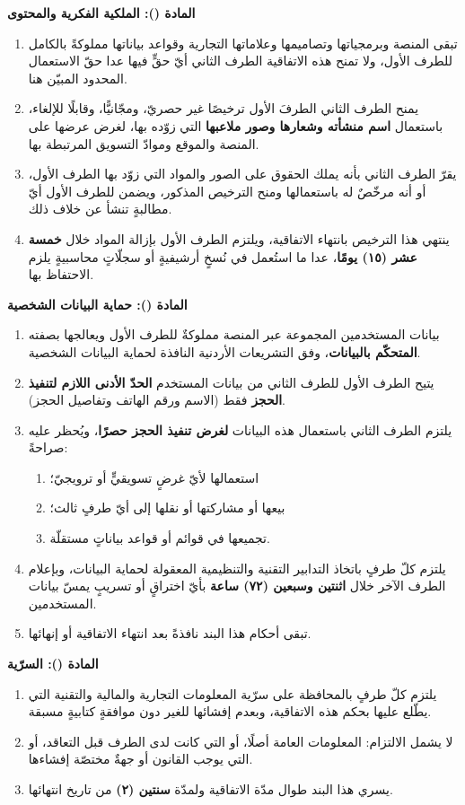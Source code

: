 \documentclass[12pt,a4paper]{article}
\newcounter{bndc}
\newcommand{\bnd}[1]{%
  \vspace{10pt}\par\noindent
  {\color{teal}\bfseries\large المادة (\arabic{bndc}): #1}%
  \stepcounter{bndc}%
  \par\vspace{2pt}\noindent{\color{rule}\rule{\linewidth}{0.6pt}}\par\vspace{4pt}%
}
\newcommand{\mlh}[1]{{\bfseries #1}}
\newenvironment{bnditems}
  {\begin{enumerate}[label=\arabic{bndc}.\arabic*,leftmargin=1.6em,itemsep=3pt,topsep=3pt]}
  {\end{enumerate}}
\newenvironment{sublist}
  {\begin{enumerate}[label=(\alph*),leftmargin=1.6em,itemsep=2pt,topsep=2pt]}
  {\end{enumerate}}
\begin{document}
\bnd{الملكية الفكرية والمحتوى}
\begin{bnditems}
  \item تبقى المنصة وبرمجياتها وتصاميمها وعلاماتها التجارية وقواعد بياناتها مملوكةً بالكامل للطرف الأول، ولا تمنح هذه الاتفاقية الطرف الثاني أيّ حقٍّ فيها عدا حقّ الاستعمال المحدود المبيّن هنا.
  \item يمنح الطرف الثاني الطرفَ الأول ترخيصًا غير حصريّ، ومجّانيًّا، وقابلًا للإلغاء، باستعمال \mlh{اسم منشأته وشعارها وصور ملاعبها} التي زوّده بها، لغرض عرضها على المنصة والموقع وموادّ التسويق المرتبطة بها.
  \item يقرّ الطرف الثاني بأنه يملك الحقوق على الصور والمواد التي زوّد بها الطرف الأول، أو أنه مرخّصٌ له باستعمالها ومنح الترخيص المذكور، ويضمن للطرف الأول أيّ مطالبةٍ تنشأ عن خلاف ذلك.
  \item ينتهي هذا الترخيص بانتهاء الاتفاقية، ويلتزم الطرف الأول بإزالة المواد خلال \mlh{خمسة عشر (١٥) يومًا}، عدا ما استُعمل في نُسخٍ أرشيفيةٍ أو سجلّاتٍ محاسبيةٍ يلزم الاحتفاظ بها.
\end{bnditems}

\bnd{حماية البيانات الشخصية}\label{art:data}
\begin{bnditems}
  \item بيانات المستخدمين المجموعة عبر المنصة مملوكةٌ للطرف الأول ويعالجها بصفته \mlh{المتحكّم بالبيانات}، وفق التشريعات الأردنية النافذة لحماية البيانات الشخصية.
  \item يتيح الطرف الأول للطرف الثاني من بيانات المستخدم \mlh{الحدّ الأدنى اللازم لتنفيذ الحجز} فقط (الاسم ورقم الهاتف وتفاصيل الحجز).
  \item يلتزم الطرف الثاني باستعمال هذه البيانات \mlh{لغرض تنفيذ الحجز حصرًا}، ويُحظر عليه صراحةً:
  \begin{sublist}
    \item استعمالها لأيّ غرضٍ تسويقيٍّ أو ترويجيّ؛
    \item بيعها أو مشاركتها أو نقلها إلى أيّ طرفٍ ثالث؛
    \item تجميعها في قوائم أو قواعد بياناتٍ مستقلّة.
  \end{sublist}
  \item يلتزم كلّ طرفٍ باتخاذ التدابير التقنية والتنظيمية المعقولة لحماية البيانات، وبإعلام الطرف الآخر خلال \mlh{اثنتين وسبعين (٧٢) ساعة} بأيّ اختراقٍ أو تسريبٍ يمسّ بيانات المستخدمين.
  \item تبقى أحكام هذا البند نافذةً بعد انتهاء الاتفاقية أو إنهائها.
\end{bnditems}

\bnd{السرّية}\label{art:conf}
\begin{bnditems}
  \item يلتزم كلّ طرفٍ بالمحافظة على سرّية المعلومات التجارية والمالية والتقنية التي يطّلع عليها بحكم هذه الاتفاقية، وبعدم إفشائها للغير دون موافقةٍ كتابيةٍ مسبقة.
  \item لا يشمل الالتزام: المعلومات العامة أصلًا، أو التي كانت لدى الطرف قبل التعاقد، أو التي يوجب القانون أو جهةٌ مختصّة إفشاءها.
  \item يسري هذا البند طوال مدّة الاتفاقية ولمدّة \mlh{سنتين (٢)} من تاريخ انتهائها.
\end{bnditems}
\end{document}
